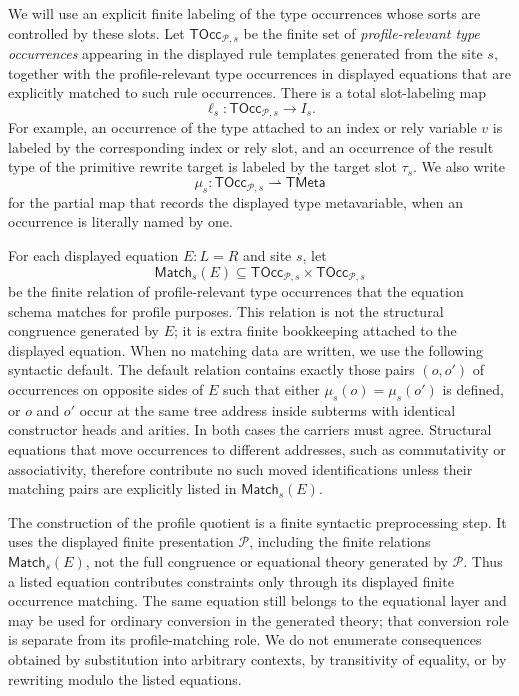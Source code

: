 \documentclass[11pt]{article}
\newcommand{\TOcc}{\mathsf{TOcc}}
\newcommand{\Match}{\mathsf{Match}}
\begin{document}
We will use an explicit finite labeling of the type occurrences whose sorts are
controlled by these slots.  Let \(\TOcc_{\mathcal{P},s}\) be the finite set of
\emph{profile-relevant type occurrences} appearing in the displayed rule
templates generated from the site \(s\), together with the profile-relevant type
occurrences in displayed equations that are explicitly matched to such rule
occurrences.  There is a total slot-labeling map
\[
  \ell_s:\TOcc_{\mathcal{P},s}\longrightarrow I_s .
\]
For example, an occurrence of the type attached to an index or rely variable
\(v\) is labeled by the corresponding index or rely slot, and an occurrence of the
result type of the primitive rewrite target is labeled by the target slot
\(\tau_s\).  We also write
\[
  \mu_s:\TOcc_{\mathcal{P},s}\rightharpoonup \mathsf{TMeta}
\]
for the partial map that records the displayed type metavariable, when an
occurrence is literally named by one.

For each displayed equation \(E:L=R\) and site \(s\), let
\[
  \Match_s(E)\subseteq \TOcc_{\mathcal{P},s}\times \TOcc_{\mathcal{P},s}
\]
be the finite relation of profile-relevant type occurrences that the equation
schema matches for profile purposes. This relation is not the structural
congruence generated by \(E\); it is extra finite bookkeeping attached to the
displayed equation.  When no matching data are written, we use the following
syntactic default.  The default relation contains exactly those pairs \((o,o')\)
of occurrences on opposite sides of \(E\) such that either
\(\mu_s(o)=\mu_s(o')\) is defined, or \(o\) and \(o'\) occur at the same tree
address inside subterms with identical constructor heads and arities.  In both
cases the carriers must agree.  Structural equations that move occurrences to
different addresses, such as commutativity or associativity, therefore contribute
no such moved identifications unless their matching pairs are explicitly listed
in \(\Match_s(E)\).

The construction of the profile quotient is a finite syntactic preprocessing
step.  It uses the displayed finite presentation \(\mathcal{P}\), including the
finite relations \(\Match_s(E)\), not the full congruence or equational theory
generated by \(\mathcal{P}\).  Thus a listed equation contributes constraints
only through its displayed finite occurrence matching.  The same equation still
belongs to the equational layer and may be used for ordinary conversion in the
generated theory; that conversion role is separate from its profile-matching
role.  We do not enumerate consequences obtained by substitution into arbitrary
contexts, by transitivity of equality, or by rewriting modulo the listed
equations.
\end{document}
